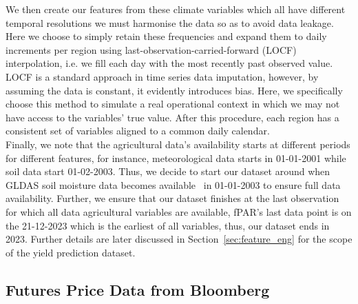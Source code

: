 \documentclass[pdflatex,sn-mathphys-num, oneside, 11pt]{sn-jnl}%
\theoremstyle{thmstyleone}%
\theoremstyle{thmstyletwo}%
\theoremstyle{thmstylethree}%
\begin{document}
We then create our features from these climate variables which all have different temporal resolutions we must harmonise the data so as to avoid data leakage. Here we choose to simply retain these frequencies and expand them to daily increments per region using last-observation-carried-forward (LOCF) interpolation, i.e. we fill each day with the most recently past observed value. LOCF is a standard approach in time series data imputation, however, by assuming the data is constant, it evidently introduces bias. Here, we specifically choose this method to simulate a real operational context in which we may not have access to the variables' true value. After this procedure, each region has a consistent set of variables aligned to a common daily calendar.\\

Finally, we note that the agricultural data's availability starts at different periods for different features, for instance, meteorological data starts in 01-01-2001 while soil data start 01-02-2003. Thus, we decide to start our dataset around when GLDAS soil moisture data becomes available~\cite{bib17} in 01-01-2003 to ensure full data availability. Further, we ensure that our dataset finishes at the last observation for which all data agricultural variables are available, fPAR's last data point is on the 21-12-2023 which is the earliest of all variables, thus, our dataset ends in 2023. Further details are later discussed in Section~\ref{sec:feature_eng} for the scope of the yield prediction dataset.

\subsection{Futures Price Data from Bloomberg}
\end{document}
